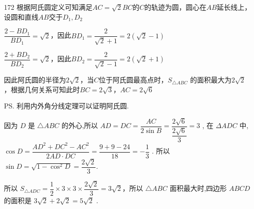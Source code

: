 \begin{enumerate}
\begin{enumerate}
\begin{jieda}
\begin{dingautolist}{172}
                根据阿氏圆定义可知满足${AC} = \sqrt{2}{BC}$的$C$的轨迹为圆，圆心在$AB$延长线上，设圆和直线$AB$交于$D_1, D_2$
                
                $\dfrac{2-BD_1}{BD_1} = \sqrt{2}$，因此$BD_1 = \dfrac{2}{\sqrt{2}+1} = 2(\sqrt{2}-1)$

                $\dfrac{2+BD_2}{BD_2} = \sqrt{2}$，因此$BD_2 = \dfrac{2}{\sqrt{2}-1} = 2(\sqrt{2}+1)$

                因此阿氏圆的半径为$2\sqrt{2}$，当$C$位于阿氏圆最高点时，${S}_{\bigtriangleup {ABC}}$ 的面积最大为$2\sqrt{2}$，根据几何关系可知此时$BC = 2\sqrt{3}$，$AC = 2\sqrt{6}$

                \ps 利用内外角分线定理可以证明阿氏圆.
            \end{dingautolist}
            
            
            因为 $D$ 是 $\bigtriangleup  {ABC}$ 的外心,所以 ${AD} = {DC} = \dfrac{AC}{2\sin B} = \dfrac{2\sqrt{6}}{\dfrac{2\sqrt{6}}{3}} = 3$ ,
            在 ${\Delta ADC}$ 中, $\cos D = \dfrac{A{D}^{2} + D{C}^{2} - A{C}^{2}}{{2AD} \cdot  {DC}} = \dfrac{9 + 9 - {24}}{18} =  - \dfrac{1}{3}$ .
            所以 $\sin D = \sqrt{1 - {\cos }^{2}D} = \dfrac{2\sqrt{2}}{3}$.
            
            所以 ${S}_{\bigtriangleup {ADC}} = \dfrac{1}{2} \times  3 \times  3 \times  \dfrac{2\sqrt{2}}{3} = 3\sqrt{2}$，所以 $\bigtriangleup {ABC}$ 面积最大时,四边形 ${ABCD}$ 的面积是 $3\sqrt{2} + 2\sqrt{2} = 5\sqrt{2}$ .
        \end{jieda}
    \end{enumerate}
\end{enumerate}